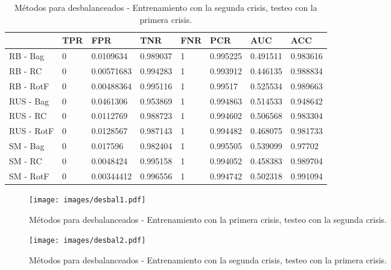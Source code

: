\documentclass[a4paper,12pt,twoside,oldfontcommands]{memoir}
\begin{document}
\begin{table}\scriptsize
    \begin{center}
        \begin{tabular}{llllllll}
            \toprule
            {} & TPR &         FPR &       TNR & FNR &       PCR &       AUC &       ACC \\
            \midrule
            RB - Bag                &   0 &   0.0109634 &  0.989037 &   1 &  0.995225 &  0.491511 &  0.983616 \\
            RB - RC       &   0 &  0.00571683 &  0.994283 &   1 &  0.993912 &  0.446135 &  0.988834 \\
            RB - RotF        &   0 &  0.00488364 &  0.995116 &   1 &   0.99517 &  0.525534 &  0.989663 \\
            RUS - Bag          &   0 &   0.0461306 &  0.953869 &   1 &  0.994863 &  0.514533 &  0.948642 \\
            RUS - RC &   0 &   0.0112769 &  0.988723 &   1 &  0.994602 &  0.506568 &  0.983304 \\
            RUS - RotF  &   0 &   0.0128567 &  0.987143 &   1 &  0.994482 &  0.468075 &  0.981733 \\
            SM - Bag                         &   0 &    0.017596 &  0.982404 &   1 &  0.995505 &  0.539099 &   0.97702 \\
            SM - RC                &   0 &   0.0048424 &  0.995158 &   1 &  0.994052 &  0.458383 &  0.989704 \\
            SM - RotF                 &   0 &  0.00344412 &  0.996556 &   1 &  0.994742 &  0.502318 &  0.991094 \\
            \bottomrule
        \end{tabular}
        \caption{Métodos para desbalanceados - Entrenamiento con la segunda crisis, testeo con la primera crisis.}
        \label{tab:crisis2}
    \end{center}
\end{table}

\begin{figure}
    \centering
    \texttt{[image: images/desbal1.pdf]}
    \caption{Métodos para desbalanceados - Entrenamiento con la primera crisis, testeo con la segunda crisis.}
    \label{fig:crisis1}
\end{figure}

\begin{figure}
    \centering
    \texttt{[image: images/desbal2.pdf]}
    \caption{Métodos para desbalanceados - Entrenamiento con la segunda crisis, testeo con la primera crisis.}
    \label{fig:crisis2}
\end{figure}
\end{document}
